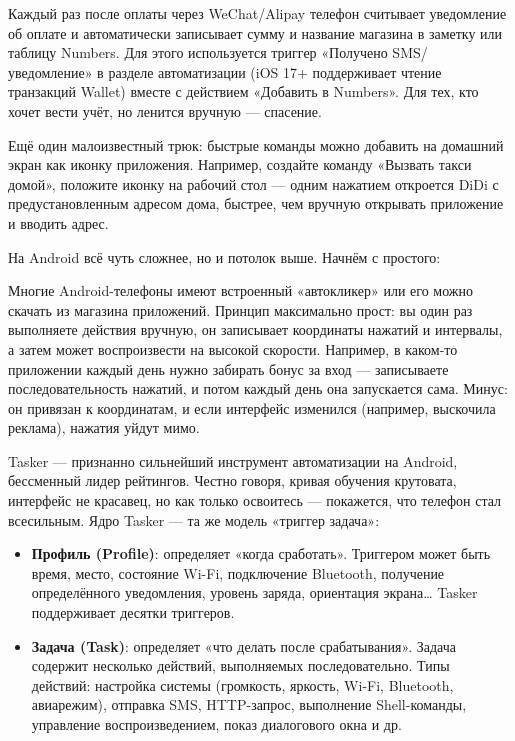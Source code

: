 Каждый раз после оплаты через WeChat/Alipay телефон считывает уведомление об оплате и автоматически записывает сумму и название магазина в заметку или таблицу Numbers. Для этого используется триггер «Получено SMS/уведомление» в разделе автоматизации (iOS 17+ поддерживает чтение транзакций Wallet) вместе с действием «Добавить в Numbers». Для тех, кто хочет вести учёт, но ленится вручную — спасение.

Ещё один малоизвестный трюк: быстрые команды можно добавить на домашний экран как иконку приложения. Например, создайте команду «Вызвать такси домой», положите иконку на рабочий стол — одним нажатием откроется DiDi с предустановленным адресом дома, быстрее, чем вручную открывать приложение и вводить адрес.


На Android всё чуть сложнее, но и потолок выше. Начнём с простого:


Многие Android-телефоны имеют встроенный «автокликер» или его можно скачать из магазина приложений. Принцип максимально прост: вы один раз выполняете действия вручную, он записывает координаты нажатий и интервалы, а затем может воспроизвести на высокой скорости. Например, в каком-то приложении каждый день нужно забирать бонус за вход — записываете последовательность нажатий, и потом каждый день она запускается сама. Минус: он привязан к координатам, и если интерфейс изменился (например, выскочила реклама), нажатия уйдут мимо.


Tasker — признанно сильнейший инструмент автоматизации на Android, бессменный лидер рейтингов. Честно говоря, кривая обучения крутовата, интерфейс не красавец, но как только освоитесь — покажется, что телефон стал всесильным. Ядро Tasker — та же модель «триггер задача»:

\begin{itemize}
  \item \textbf{Профиль (Profile)}: определяет «когда сработать». Триггером может быть время, место, состояние Wi-Fi, подключение Bluetooth, получение определённого уведомления, уровень заряда, ориентация экрана… Tasker поддерживает десятки триггеров.
  \item \textbf{Задача (Task)}: определяет «что делать после срабатывания». Задача содержит несколько действий, выполняемых последовательно. Типы действий: настройка системы (громкость, яркость, Wi-Fi, Bluetooth, авиарежим), отправка SMS, HTTP-запрос, выполнение Shell-команды, управление воспроизведением, показ диалогового окна и др.
\end{itemize}

